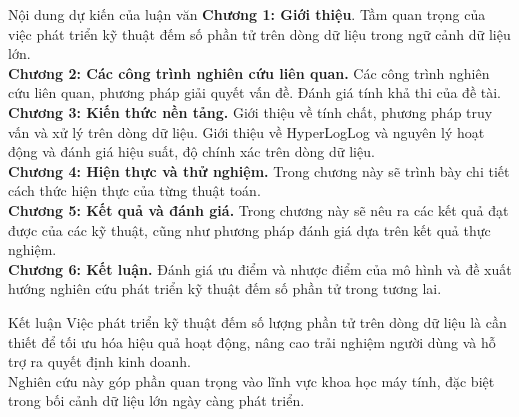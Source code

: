 \documentclass[10pt]{beamer}
\newcommand{\themename}{\textbf{\textsc{metropolis}}\xspace}
\begin{document}
\begin{frame}{Nội dung dự kiến của luận văn}
  \textbf{Chương 1: Giới thiệu}. Tầm quan trọng của việc phát triển kỹ thuật đếm 
  số phần tử trên dòng dữ liệu trong ngữ cảnh 
  dữ liệu lớn.\\
  \textbf{Chương 2: Các công trình nghiên cứu liên quan.} Các công trình nghiên cứu 
  liên quan, phương pháp giải quyết vấn đề. Đánh giá tính khả thi của đề tài.\\
  \textbf{Chương 3: Kiến thức nền tảng.} Giới thiệu về tính chất, phương pháp
  truy vấn và xử lý trên dòng dữ liệu. Giới thiệu về HyperLogLog và nguyên lý 
  hoạt động và đánh giá hiệu suất, độ chính xác trên dòng dữ liệu.\\
  \textbf{Chương 4: Hiện thực và thử nghiệm. } Trong chương này sẽ trình bày chi tiết 
  cách thức hiện thực của từng thuật toán.\\
  \textbf{Chương 5: Kết quả và đánh giá.} Trong chương này sẽ nêu ra các kết quả 
  đạt được của các kỹ thuật, cũng như phương pháp đánh giá dựa trên kết quả thực nghiệm.\\
  \textbf{Chương 6: Kết luận.} Đánh giá ưu điểm và nhược điểm của mô hình và 
  đề xuất hướng nghiên cứu phát triển kỹ thuật đếm số phần tử trong tương lai.
\end{frame}

\begin{frame}{Kết luận}
  Việc phát triển kỹ thuật đếm số lượng phần tử trên dòng dữ liệu là cần thiết để tối ưu hóa hiệu quả hoạt động, nâng cao trải nghiệm người dùng và hỗ trợ ra quyết định kinh doanh.\\ 
  Nghiên cứu này góp phần quan trọng vào lĩnh vực khoa học máy tính, đặc biệt trong bối cảnh dữ liệu lớn ngày càng phát triển.
\end{frame}


\end{document}
